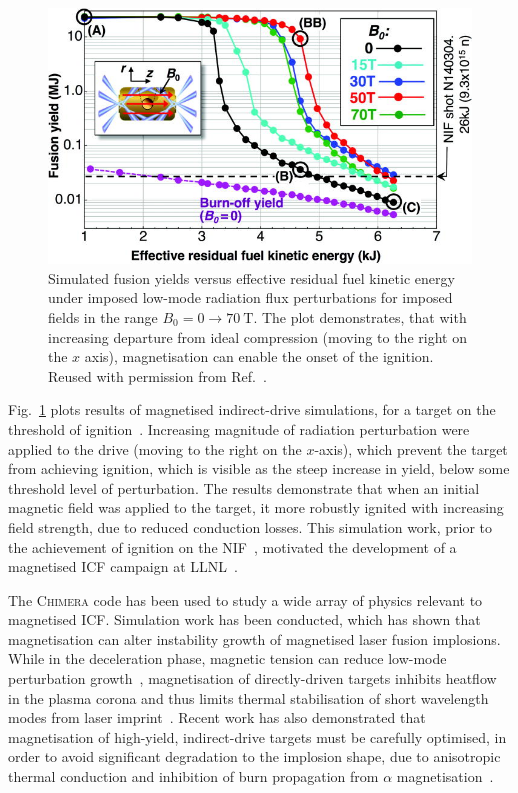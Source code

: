 \begin{figure}[t!]
    \includegraphics[width=0.75\linewidth]{Results2/Images/magicf_perkins.jpeg}
    \centering
    \caption{Simulated fusion yields versus effective residual fuel kinetic energy under imposed low-mode radiation flux perturbations for imposed fields in the range $B_0=0\rightarrow70\ \text{T}$.
    The plot demonstrates, that with increasing departure from ideal compression (moving to the right on the $x$ axis), magnetisation can enable the onset of the ignition.
    Reused with permission from Ref.~\cite{perkins_potential_2017}.}%
    \label{fig:Res2_perkins_magicf}
\end{figure}

Fig.~\ref{fig:Res2_perkins_magicf} plots results of magnetised indirect-drive simulations, for a target on the threshold of ignition~\cite{perkins_potential_2017}.
Increasing magnitude of radiation perturbation were applied to the drive (moving to the right on the $x$-axis), which prevent the target from achieving ignition, which is visible as the steep increase in yield, below some threshold level of perturbation.
The results demonstrate that when an initial magnetic field was applied to the target, it more robustly ignited with increasing field strength, due to reduced conduction losses.
This simulation work, prior to the achievement of ignition on the \ac{NIF}~\cite{zylstra_burning_2022}, motivated the development of a magnetised \ac{ICF} campaign at \ac{LLNL}~\cite{moody_magnetized_2022}.

The \textsc{Chimera} code has been used to study a wide array of physics relevant to magnetised \ac{ICF}.
Simulation work has been conducted, which has shown that magnetisation can alter instability growth of magnetised laser fusion implosions.
While in the deceleration phase, magnetic tension can reduce low-mode perturbation growth~\cite{walsh_perturbation_2019}, magnetisation of directly-driven targets inhibits heatflow in the plasma corona and thus limits thermal stabilisation of short wavelength modes from laser imprint~\cite{walsh_magnetized_2020}.
Recent work has also demonstrated that magnetisation of high-yield, indirect-drive targets must be carefully optimised, in order to avoid significant degradation to the implosion shape, due to anisotropic thermal conduction and inhibition of burn propagation from $\alpha$ magnetisation~\cite{oneill_modelling_2023}.

